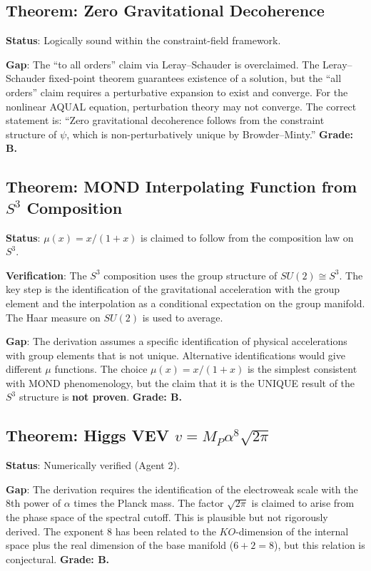 \documentclass[11pt,a4paper]{article}
\begin{document}
\subsection{Theorem: Zero Gravitational Decoherence}

\textbf{Status}: Logically sound within the constraint-field framework.

\textbf{Gap}: The ``to all orders'' claim via Leray--Schauder is overclaimed. The Leray--Schauder fixed-point theorem guarantees existence of a solution, but the ``all orders'' claim requires a perturbative expansion to exist and converge. For the nonlinear AQUAL equation, perturbation theory may not converge. The correct statement is: ``Zero gravitational decoherence follows from the constraint structure of $\psi$, which is non-perturbatively unique by Browder--Minty.'' \textbf{Grade: B.}

\subsection{Theorem: MOND Interpolating Function from $S^3$ Composition}

\textbf{Status}: $\mu(x) = x/(1+x)$ is claimed to follow from the composition law on $S^3$.

\textbf{Verification}: The $S^3$ composition uses the group structure of $SU(2) \cong S^3$. The key step is the identification of the gravitational acceleration with the group element and the interpolation as a conditional expectation on the group manifold. The Haar measure on $SU(2)$ is used to average.

\textbf{Gap}: The derivation assumes a specific identification of physical accelerations with group elements that is not unique. Alternative identifications would give different $\mu$ functions. The choice $\mu(x) = x/(1+x)$ is the simplest consistent with MOND phenomenology, but the claim that it is the UNIQUE result of the $S^3$ structure is \textbf{not proven}. \textbf{Grade: B.}

\subsection{Theorem: Higgs VEV $v = M_P \alpha^8 \sqrt{2\pi}$}

\textbf{Status}: Numerically verified (Agent 2).

\textbf{Gap}: The derivation requires the identification of the electroweak scale with the 8th power of $\alpha$ times the Planck mass. The factor $\sqrt{2\pi}$ is claimed to arise from the phase space of the spectral cutoff. This is plausible but not rigorously derived. The exponent 8 has been related to the $KO$-dimension of the internal space plus the real dimension of the base manifold ($6 + 2 = 8$), but this relation is conjectural. \textbf{Grade: B.}
\end{document}
